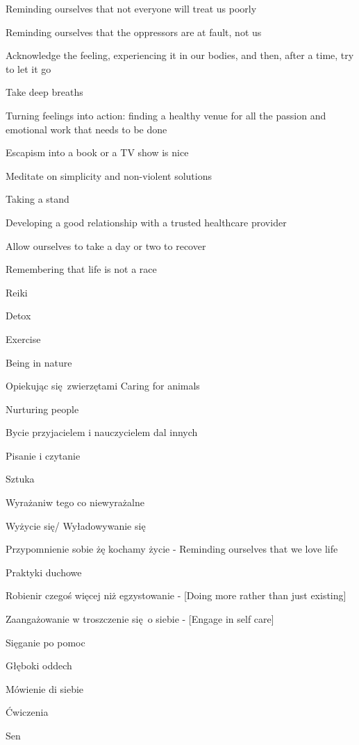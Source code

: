 \begin{multicols}{2}
\begin{checkboxlist}
\item Reminding ourselves that not everyone will treat us poorly
\item Reminding ourselves that the oppressors are at fault, not us
\item Acknowledge the feeling, experiencing it in our bodies, and then, after a time, try to let it go
\item Take deep breaths
\item Turning feelings into action: finding a healthy venue for all the passion and emotional work that needs to be done
\item Escapism into a book or a TV show is nice
\item Meditate on simplicity and non-violent solutions
\item Taking a stand
\item Developing a good relationship with a trusted healthcare provider
\item Allow ourselves to take a day or two to recover
\item Remembering that life is not a race
\item Reiki
\item Detox
\item Exercise
\item Being in nature
\item Opiekując się zwierzętami Caring for animals
\item Nurturing people
\item Bycie przyjacielem i nauczycielem dal innych
\item Pisanie i czytanie
\item Sztuka
\item Wyrażaniw tego co niewyrażalne
\item Wyżycie się/ Wyładowywanie się
\item Przypomnienie sobie żę kochamy życie - Reminding ourselves that we love life
\item Praktyki duchowe
\item Robienir czegoś więcej niż egzystowanie - [Doing more rather than just existing]
\item Zaangażowanie w troszczenie się o siebie - [Engage in self care]
\item Sięganie po pomoc
\item Głęboki oddech
\item Mówienie di siebie
\item Ćwiczenia
\item Sen
\end{checkboxlist}
\end{multicols}

